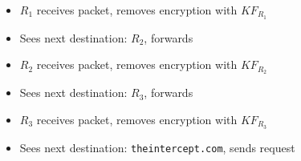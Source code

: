 \begin{frame}
\begin{columns}
%

    \begin{itemize}
      \item $R_1$ receives packet, removes encryption with $KF_{R_1}$
      \item<2-> Sees next destination: $R_2$, forwards
      \item<3-> $R_2$ receives packet, removes encryption with $KF_{R_2}$
      \item<4-> Sees next destination: $R_3$, forwards
      \item<5-> $R_3$ receives packet, removes encryption with $KF_{R_3}$
      \item<6-> Sees next destination: \texttt{theintercept.com}, sends request
    \end{itemize}
  \end{columns}
\end{frame}


